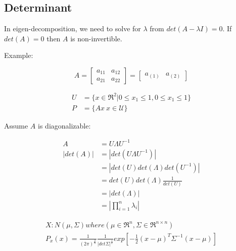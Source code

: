 \subsection{Determinant}

In eigen-decomposition, we need to solve for $\lambda$ from $det(A - \lambda I) = 0$. 
If $det(A) = 0$ then $A$ is non-invertible. 

Example:

$$A = 
\left[
\begin{matrix}
a_{11} & a_{12}\\
a_{21} & a_{22}
\end{matrix}
\right] =
\left[
\begin{matrix}
a_{(1)} & a_{(2)}
\end{matrix}
\right]
$$

\begin{align*}
U &= \{x\in \Re^2 | 0\leq x_1 \leq 1, 0\leq x_1 \leq 1 \}\\
P &= \{Ax \ x\in \mathcal{U}\} 
\end{align*}


\begin{figure}
	\centering
	\resizebox{7.5cm}{3cm}{}
	\caption{}
	\label{}
\end{figure}

Assume $A$ is diagonalizable:

\begin{align*}
A &= U\Lambda U^{-1}\\
|det(A)| &= |det(U\Lambda U^{-1})| \\
&= |det(U)det(\Lambda)det(U^{-1})|\\
&= det(U)det(\Lambda)\frac{1}{det(U)}\\
&= |det(\Lambda)|\\
&= |\prod^n_{i=1}\lambda_i|
\end{align*}

\begin{align*}
X: N(\mu, \Sigma)where(\mu \in \Re^n, \Sigma \in \Re^{n\times n})\\
P_x(x) = \frac{1}{(2\pi)^{\frac{2}{n}}}\frac{1}{|det\Sigma|^{\frac{1}{2}}}exp[-\frac{1}{2}(x - \mu)^T\Sigma^{-1}(x - \mu)]
\end{align*}

